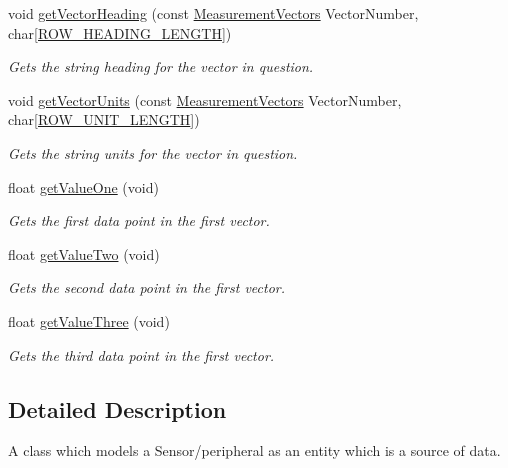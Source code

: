 \begin{DoxyCompactItemize}
void \mbox{\hyperlink{class_data_source_a79d69573a651290750aa8c08d24f3b64}{get\+Vector\+Heading}} (const \mbox{\hyperlink{_s_p_i___instruction_set_8h_a9d8048399836e11887f85cc8dc3d75d5}{Measurement\+Vectors}} Vector\+Number, char\mbox{[}\mbox{\hyperlink{_s_p_i___instruction_set_8h_a63a97a0fe356d1b3030dfb633e0d0b8e}{R\+O\+W\+\_\+\+H\+E\+A\+D\+I\+N\+G\+\_\+\+L\+E\+N\+G\+TH}}\mbox{]})
\begin{DoxyCompactList}\small\item\em Gets the string heading for the vector in question. \end{DoxyCompactList}\item 
void \mbox{\hyperlink{class_data_source_af2a2f33b9970ecff75894134498ff2cd}{get\+Vector\+Units}} (const \mbox{\hyperlink{_s_p_i___instruction_set_8h_a9d8048399836e11887f85cc8dc3d75d5}{Measurement\+Vectors}} Vector\+Number, char\mbox{[}\mbox{\hyperlink{_s_p_i___instruction_set_8h_af45194e4246701e52a2d67f27cc3ffb8}{R\+O\+W\+\_\+\+U\+N\+I\+T\+\_\+\+L\+E\+N\+G\+TH}}\mbox{]})
\begin{DoxyCompactList}\small\item\em Gets the string units for the vector in question. \end{DoxyCompactList}\item 
float \mbox{\hyperlink{class_data_source_ac70e056b629dd62379c42af3e6ca6b1b}{get\+Value\+One}} (void)
\begin{DoxyCompactList}\small\item\em Gets the first data point in the first vector. \end{DoxyCompactList}\item 
float \mbox{\hyperlink{class_data_source_accbfa79e7afee154b4332483181f27ec}{get\+Value\+Two}} (void)
\begin{DoxyCompactList}\small\item\em Gets the second data point in the first vector. \end{DoxyCompactList}\item 
float \mbox{\hyperlink{class_data_source_ad7870f61cbf33ac7a284b47930ff5bcf}{get\+Value\+Three}} (void)
\begin{DoxyCompactList}\small\item\em Gets the third data point in the first vector. \end{DoxyCompactList}\end{DoxyCompactItemize}


\subsection{Detailed Description}
A class which models a Sensor/peripheral as an entity which is a source of data. 

